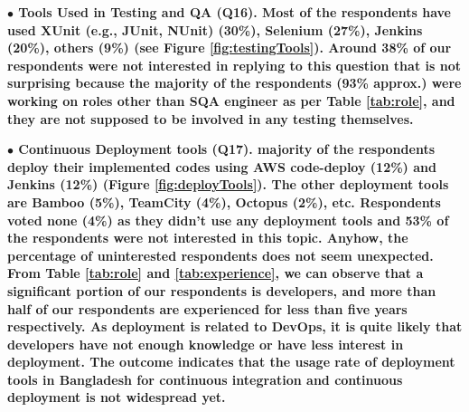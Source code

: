 \nd\bf{$\bullet$ Tools Used in Testing and QA (Q16).} Most of the
respondents have used XUnit (e.g., JUnit, NUnit) (30\%), Selenium (27\%),
Jenkins (20\%), others (9\%) (see Figure \ref{fig:testingTools}). Around
38\% of our respondents were not interested in replying to this question that is
not surprising because the majority of the respondents (93\% approx.) were
working on roles other than SQA engineer as per Table \ref{tab:role}, and they
are not supposed to be involved in any testing themselves. 



\nd\bf{$\bullet$ Continuous Deployment tools (Q17).} majority of the respondents deploy their implemented codes using AWS code-deploy
(12\%) and Jenkins (12\%) (Figure \ref{fig:deployTools}). The other deployment tools are Bamboo (5\%), TeamCity
(4\%), Octopus (2\%), etc. Respondents voted none (4\%) as they didn't use any
deployment tools and 53\% of the respondents were not interested in this topic.
Anyhow, the percentage of uninterested respondents does not seem unexpected.
From Table \ref{tab:role} and \ref{tab:experience}, we can observe that a
significant portion of our respondents is developers, and more than half of our
respondents are experienced for less than five years respectively. As deployment
is related to DevOps, it is quite likely that developers have not enough
knowledge or have less interest in deployment. 
The outcome indicates that the usage rate of
deployment tools in Bangladesh for continuous integration and continuous
deployment is not widespread yet. 

